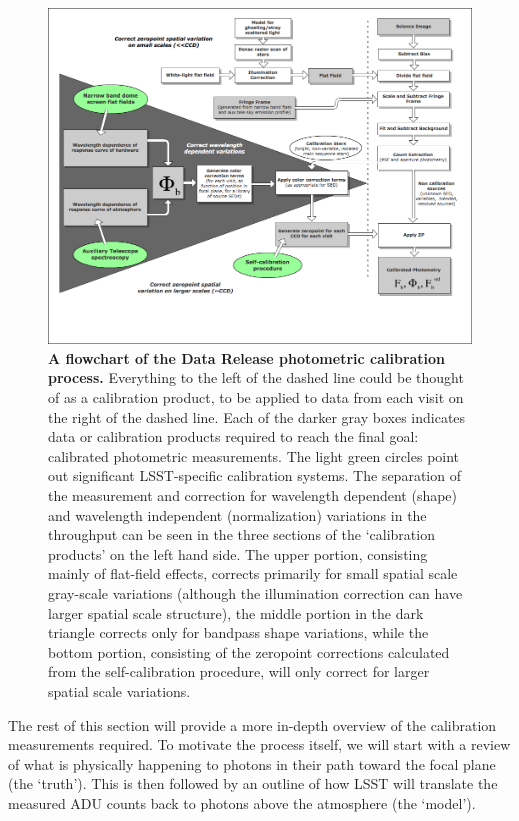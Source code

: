\documentclass[12pt,preprint]{aastex}
\begin{document}
\begin{figure}[htbp]
\includegraphics[width=6.5in]{calib_overview}
\caption{ {\small {\bf A flowchart of the Data Release photometric
      calibration process.} Everything to the left of the dashed line
    could be thought of as a calibration product, to be applied to
    data from each visit on the right of the dashed line. Each of the
    darker gray boxes indicates data or calibration products required
    to reach the final goal: calibrated photometric measurements. The
    light green circles point out significant LSST-specific calibration
    systems. The separation of the measurement and correction for 
    wavelength dependent (shape) and wavelength independent
    (normalization) variations in the throughput can be seen in the
    three sections of the `calibration products' on the left hand
    side. The upper portion, consisting mainly of flat-field effects,
    corrects primarily for small spatial scale gray-scale variations (although
    the illumination correction can have larger spatial scale
    structure), the middle portion in the dark triangle corrects only
    for bandpass shape variations, while the bottom portion,
    consisting of the zeropoint corrections calculated from the
    self-calibration procedure, will only correct for larger spatial
    scale variations. }
\label{fig:overview_flowchart} }
\end{figure}

The rest of this section will provide a more in-depth overview of the
calibration measurements required. To motivate the process itself, we
will start with a review of what is physically happening to photons in
their path toward the focal plane (the `truth'). This is then followed
by an outline of how LSST will translate the measured ADU counts back
to photons above the atmosphere (the `model').
\end{document}
